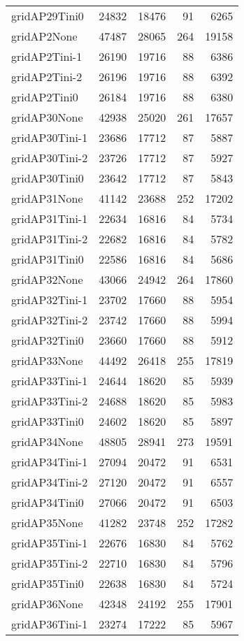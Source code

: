 \begin{longtable}{lrrrr}
gridAP29Tini0 & 24832 & 18476 & 91 & 6265 \\
gridAP2None & 47487 & 28065 & 264 & 19158 \\
gridAP2Tini-1 & 26190 & 19716 & 88 & 6386 \\
gridAP2Tini-2 & 26196 & 19716 & 88 & 6392 \\
gridAP2Tini0 & 26184 & 19716 & 88 & 6380 \\
gridAP30None & 42938 & 25020 & 261 & 17657 \\
gridAP30Tini-1 & 23686 & 17712 & 87 & 5887 \\
gridAP30Tini-2 & 23726 & 17712 & 87 & 5927 \\
gridAP30Tini0 & 23642 & 17712 & 87 & 5843 \\
gridAP31None & 41142 & 23688 & 252 & 17202 \\
gridAP31Tini-1 & 22634 & 16816 & 84 & 5734 \\
gridAP31Tini-2 & 22682 & 16816 & 84 & 5782 \\
gridAP31Tini0 & 22586 & 16816 & 84 & 5686 \\
gridAP32None & 43066 & 24942 & 264 & 17860 \\
gridAP32Tini-1 & 23702 & 17660 & 88 & 5954 \\
gridAP32Tini-2 & 23742 & 17660 & 88 & 5994 \\
gridAP32Tini0 & 23660 & 17660 & 88 & 5912 \\
gridAP33None & 44492 & 26418 & 255 & 17819 \\
gridAP33Tini-1 & 24644 & 18620 & 85 & 5939 \\
gridAP33Tini-2 & 24688 & 18620 & 85 & 5983 \\
gridAP33Tini0 & 24602 & 18620 & 85 & 5897 \\
gridAP34None & 48805 & 28941 & 273 & 19591 \\
gridAP34Tini-1 & 27094 & 20472 & 91 & 6531 \\
gridAP34Tini-2 & 27120 & 20472 & 91 & 6557 \\
gridAP34Tini0 & 27066 & 20472 & 91 & 6503 \\
gridAP35None & 41282 & 23748 & 252 & 17282 \\
gridAP35Tini-1 & 22676 & 16830 & 84 & 5762 \\
gridAP35Tini-2 & 22710 & 16830 & 84 & 5796 \\
gridAP35Tini0 & 22638 & 16830 & 84 & 5724 \\
gridAP36None & 42348 & 24192 & 255 & 17901 \\
gridAP36Tini-1 & 23274 & 17222 & 85 & 5967 \\

\end{longtable}
